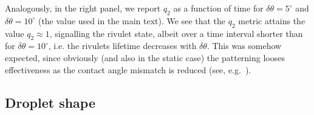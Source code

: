 Analogously, in the right panel, we report $q_2$ as a function of time for $\delta \theta = 5^{\circ}$  and $\delta \theta = 10^{\circ}$ (the value used in the main text). 
We see that the $q_2$ metric attains the value $q_2 \approx 1$, signalling the rivulet state, albeit over a time interval shorter than for $\delta \theta = 10^{\circ}$, i.e. the rivulets lifetime decreases with $\delta \theta$. 
This was somehow expected, since obviously (and also in the static case) the patterning looses effectiveness as the contact angle mismatch is reduced (see, e.g.~\cite{konnurInstabilityMorphologyThin2000}).

\subsection{Droplet shape}

